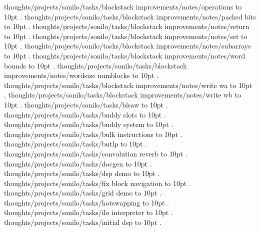 \smallskip
thoughts/projects/sonilo/tasks/blockstack improvements/notes/operations \leaders\hbox to 10pt {\hss.\hss}  \hfill {}
\smallskip
thoughts/projects/sonilo/tasks/blockstack improvements/notes/packed bits \leaders\hbox to 10pt {\hss.\hss}  \hfill {}
\smallskip
thoughts/projects/sonilo/tasks/blockstack improvements/notes/return \leaders\hbox to 10pt {\hss.\hss}  \hfill {}
\smallskip
thoughts/projects/sonilo/tasks/blockstack improvements/notes/set \leaders\hbox to 10pt {\hss.\hss}  \hfill {}
\smallskip
thoughts/projects/sonilo/tasks/blockstack improvements/notes/subarrays \leaders\hbox to 10pt {\hss.\hss}  \hfill {}
\smallskip
thoughts/projects/sonilo/tasks/blockstack improvements/notes/word bounds \leaders\hbox to 10pt {\hss.\hss}  \hfill {}
\smallskip
thoughts/projects/sonilo/tasks/blockstack improvements/notes/wordsize numblocks \leaders\hbox to 10pt {\hss.\hss}  \hfill {}
\smallskip
thoughts/projects/sonilo/tasks/blockstack improvements/notes/write wa \leaders\hbox to 10pt {\hss.\hss}  \hfill {}
\smallskip
thoughts/projects/sonilo/tasks/blockstack improvements/notes/write wb \leaders\hbox to 10pt {\hss.\hss}  \hfill {}
\smallskip
thoughts/projects/sonilo/tasks/blsaw \leaders\hbox to 10pt {\hss.\hss}  \hfill {}
\smallskip
thoughts/projects/sonilo/tasks/buddy slots \leaders\hbox to 10pt {\hss.\hss}  \hfill {}
\smallskip
thoughts/projects/sonilo/tasks/buddy system \leaders\hbox to 10pt {\hss.\hss}  \hfill {}
\smallskip
thoughts/projects/sonilo/tasks/bulk instructions \leaders\hbox to 10pt {\hss.\hss}  \hfill {}
\smallskip
thoughts/projects/sonilo/tasks/butlp \leaders\hbox to 10pt {\hss.\hss}  \hfill {}
\smallskip
thoughts/projects/sonilo/tasks/convolution reverb \leaders\hbox to 10pt {\hss.\hss}  \hfill {}
\smallskip
thoughts/projects/sonilo/tasks/docgen \leaders\hbox to 10pt {\hss.\hss}  \hfill {}
\smallskip
thoughts/projects/sonilo/tasks/dsp demo \leaders\hbox to 10pt {\hss.\hss}  \hfill {}
\smallskip
thoughts/projects/sonilo/tasks/fix block navigation \leaders\hbox to 10pt {\hss.\hss}  \hfill {}
\smallskip
thoughts/projects/sonilo/tasks/grid demo \leaders\hbox to 10pt {\hss.\hss}  \hfill {}
\smallskip
thoughts/projects/sonilo/tasks/hotswapping \leaders\hbox to 10pt {\hss.\hss}  \hfill {}
\smallskip
thoughts/projects/sonilo/tasks/ilo interpreter \leaders\hbox to 10pt {\hss.\hss}  \hfill {}
\smallskip
thoughts/projects/sonilo/tasks/initial dsp \leaders\hbox to 10pt {\hss.\hss}  \hfill {}
